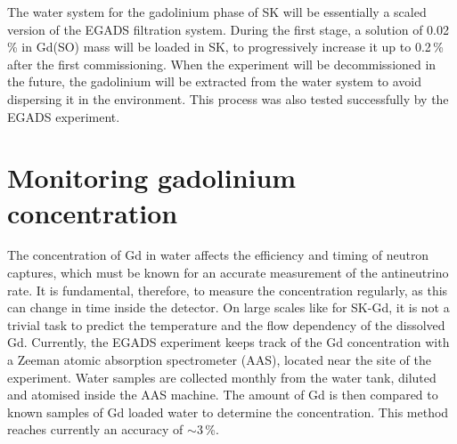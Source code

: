 The water system for the gadolinium phase of SK will be essentially a scaled version of the EGADS filtration system.
During the first stage, a solution of 0.02\,\% in Gd(SO) mass will be loaded in SK, %
to progressively increase it up to 0.2\,\% after the first commissioning.
When the experiment will be decommissioned in the future, the gadolinium will be extracted from the water system %
to avoid dispersing it in the environment.
This process was also tested successfully by the EGADS experiment.

\section{Monitoring gadolinium concentration}
\label{sec:gad}

The concentration of Gd in water affects the efficiency and timing of neutron captures, %
which must be known for an accurate measurement of the antineutrino rate.
It is fundamental, therefore, to measure the concentration regularly, as this can change in time inside the detector.
On large scales like for SK-Gd, it is not a trivial task to predict the temperature and the flow dependency %
of the dissolved Gd.
Currently, the EGADS experiment keeps track of the Gd concentration with a Zeeman atomic absorption spectrometer (AAS), %
located near the site of the experiment.
Water samples are collected monthly from the water tank, diluted and atomised inside the AAS machine.
The amount of Gd is then compared to known samples of Gd loaded water to determine the concentration.
This method reaches currently an accuracy of $\sim3$\,\%.

